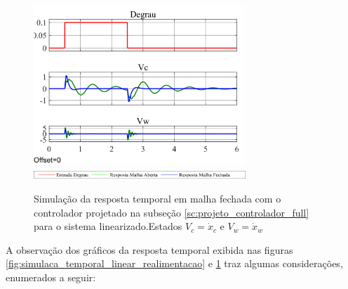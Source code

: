 \documentclass[a4paper]{ifacconf}
\begin{document}
	\FloatBarrier
    \begin{figure}[htbp]
        \begin{centering}
            \includegraphics[width=8cm]{img/simulaca_temporal_linear_realimentacao_V.png}
            \includegraphics[width=8cm]{img/sim_linear_simulink_temp_leg.png}
            \caption{Simulação da resposta temporal em malha fechada com o controlador projetado na subseção \ref{sc:projeto_controlador_full} para o sistema linearizado.Estados $V_c = \dot{x}_c$ e $V_w = \dot{x}_w$ }
            \label{fig:simulaca_temporal_linear_realimentacao_V}
        \end{centering}
    \end{figure}
    \FloatBarrier
    
    A observação dos gráficos da resposta temporal exibida nas figuras \ref{fig:simulaca_temporal_linear_realimentacao} e \ref{fig:simulaca_temporal_linear_realimentacao_V} traz algumas considerações, enumerados a seguir:
    
\end{document}
